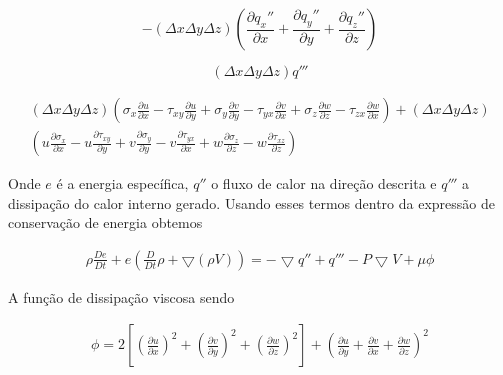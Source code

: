 \documentclass[]{article}
\begin{document}
\begin{equation}
	 - (\Delta x \Delta y \Delta z) 
	\left( \frac{\partial q_x''}{\partial x} + \frac{\partial q_y''}{\partial y} + \frac{\partial q_z''}{\partial z} \right)
\end{equation}

\begin{equation}
	(\Delta x \Delta y \Delta z) q'''
\end{equation}

\begin{equation}
	\begin{aligned}
	(\Delta x \Delta y \Delta z) \left( \sigma_x \frac{\partial u}{\partial x} - \tau_{xy} \frac{\partial u}{\partial y} + \sigma_y \frac{\partial v}{\partial y} - \tau_{yx} \frac{\partial v}{\partial x} + \sigma_z \frac{\partial w}{\partial z} - \tau_{zx} \frac{\partial w}{\partial x} \right ) + (\Delta x \Delta y \Delta z) \\
	\left( u \frac{\partial \sigma_x}{\partial x} - u \frac{\partial \tau_{xy}}{\partial y} + v \frac{\partial \sigma_y}{\partial y} - v \frac{\partial \tau_{yx}}{\partial x} + w \frac{\partial \sigma_z}{\partial z} - w \frac{\partial \tau_{xz}}{\partial z} \right)
\end{aligned}
\end{equation}

Onde $e$ é a energia específica, $q''$ o fluxo de calor na direção descrita e $q'''$ a dissipação do calor interno gerado. Usando esses termos dentro da expressão de conservação de energia obtemos

\begin{equation}
	\begin{aligned}
		\rho \frac{ De}{Dt} + e(\frac{D}{D t} \rho +  \bigtriangledown (\rho V)) = -\bigtriangledown q'' + q''' - P\bigtriangledown V + \mu \phi
	\end{aligned}
\end{equation}

A função de dissipação viscosa sendo

\begin{equation}
	\begin{aligned}
		\phi = 2[(\frac{\partial u}{\partial x})^{2} + (\frac{\partial v}{\partial y})^{2} + (\frac{\partial w}{\partial z})^{2}] + (\frac{\partial u}{\partial y} + \frac{\partial v}{\partial x} + \frac{\partial w}{\partial z})^{2}
	\end{aligned}
\end{equation}
\end{document}
